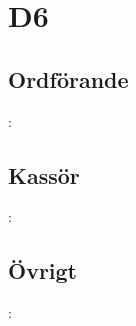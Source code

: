 \section{D6}
\subsection{Ordförande}
\begin{frame}{\secname: \subsecname}

\end{frame}

\subsection{Kassör}
\begin{frame}{\secname: \subsecname}
\end{frame}

\subsection{Övrigt}
\begin{frame}{\secname: \subsecname}
\end{frame}